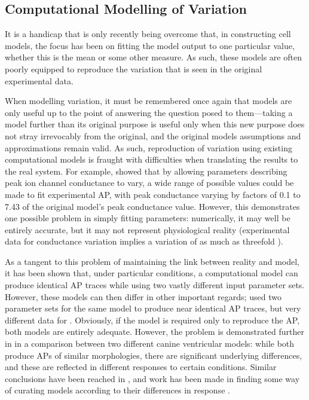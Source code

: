 \documentclass[../thesis-main.tex]{subfiles}
\begin{document}
\subsection{Computational Modelling of Variation}
\label{subsec:comp-var}
It is a handicap that is only recently being overcome that, in constructing cell models, the focus has been on fitting the model output to one particular value, whether this is the mean or some other measure. As such, these models are often poorly equipped to reproduce the variation that is seen in the original experimental data.

When modelling variation, it must be remembered once again that models are only useful up to the point of answering the question posed to them---taking a model further than its original purpose is useful only when this new purpose does not stray irrevocably from the original, and the original models assumptions and approximations remain valid. As such, reproduction of variation using existing computational models is fraught with difficulties when translating the results to the real system. For example,  \citet{Davies2012} showed that by allowing parameters describing peak ion channel conductance to vary, a wide range of possible values could be made to fit experimental AP, with peak conductance varying by factors of 0.1 to 7.43 of the original model's peak conductance value. However, this demonstrates one possible problem in simply fitting parameters: numerically, it may well be entirely accurate, but it may not represent physiological reality (experimental data for conductance variation implies a variation of as much as threefold \citep{Schulz2006}).

As a tangent to this problem of maintaining the link between reality and model, it has been shown that, under particular conditions, a computational model can produce identical AP traces while using two vastly different input parameter sets. However, these models can then differ in other important regards; \citet{Sarkar2010} used two parameter sets for the same model to produce near identical AP traces, but very different data for \cai{}. Obviously, if the model is required only to reproduce the AP, both models are entirely adequate. However, the problem is demonstrated further in \citet{Cherry2007} in a comparison between two different canine ventricular models: while both produce APs of similar morphologies, there are significant underlying differences, and these are reflected in different responses to certain conditions. Similar conclusions have been reached in \citet{Romero2011}, and work has been made in finding some way of curating models according to their differences in response \citep{Terkildsen2008, Cooper2011}.
\end{document}
